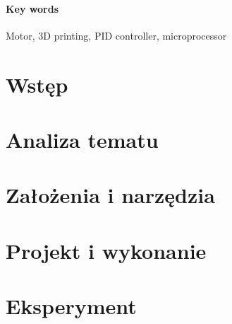 \documentclass[a4paper,twoside,12pt]{book}
\begin{document}
\subsubsection*{Key words}  
\begin{otherlanguage}{british}
Motor, 3D printing, PID controller, microprocessor
\end{otherlanguage}

\tableofcontents

\setcounter{stronyPozaNumeracja}{\value{page}}
\mainmatter
\pagestyle{empty}

\cleardoublepage

\pagestyle{NumeryStronNazwyRozdzialow}


\chapter{Wstęp}


\chapter{Analiza tematu}


\chapter{Założenia i narzędzia}


\chapter{Projekt i wykonanie}


\chapter{Eksperyment}

\end{document}
